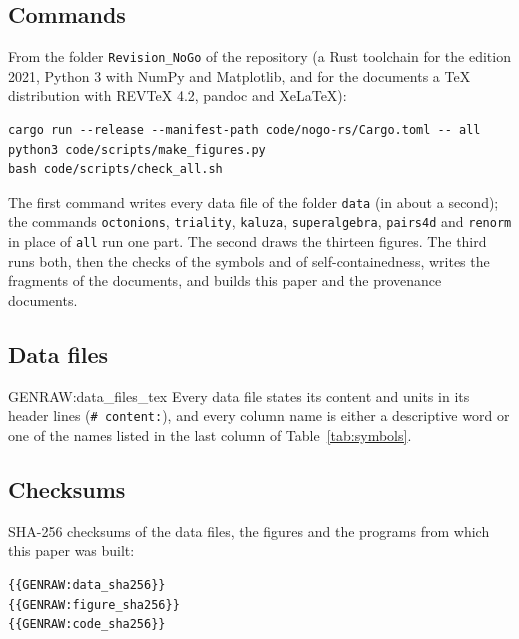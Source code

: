 \subsection{Commands}

From the folder \texttt{Revision\_NoGo} of the repository (a Rust toolchain for the edition 2021,
Python 3 with NumPy and Matplotlib, and for the documents a TeX distribution with REVTeX 4.2, pandoc and
XeLaTeX):
\begin{verbatim}
cargo run --release --manifest-path code/nogo-rs/Cargo.toml -- all
python3 code/scripts/make_figures.py
bash code/scripts/check_all.sh
\end{verbatim}
The first command writes every data file of the folder \texttt{data} (in about a second); the
commands \texttt{octonions}, \texttt{triality}, \texttt{kaluza}, \texttt{superalgebra}, \texttt{pairs4d}
and \texttt{renorm} in place of \texttt{all} run one part. The second draws the thirteen figures. The
third runs both, then the checks of the symbols and of self-containedness, writes the fragments of the
documents, and builds this paper and the provenance documents.

\subsection{Data files}

{{GENRAW:data_files_tex}}
Every data file states its content and units in its header lines (\texttt{\# content:}), and every
column name is either a descriptive word or one of the names listed in the last column of
Table~\ref{tab:symbols}.

\subsection{Checksums}

SHA-256 checksums of the data files, the figures and the programs from which this paper was built:
{\footnotesize
\begin{verbatim}
{{GENRAW:data_sha256}}
{{GENRAW:figure_sha256}}
{{GENRAW:code_sha256}}
\end{verbatim}
}

\twocolumngrid
